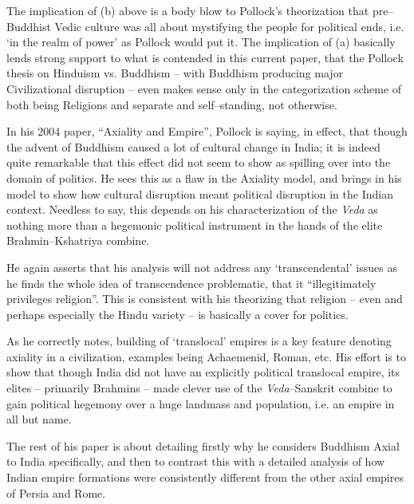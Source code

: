 The implication of (b) above is a body blow to Pollock’s theorization that pre–Buddhist Vedic culture was all about mystifying the people for political ends, i.e. ‘in the realm of power’ as Pollock would put it. The implication of (a) basically lends strong support to what is contended in this current paper, that the Pollock thesis on Hinduism vs. Buddhism – with Buddhism producing major Civilizational disruption – even makes sense only in the categorization scheme of both being Religions and separate and self–standing, not otherwise.

In his 2004 paper, “Axiality and Empire”, Pollock is saying, in effect, that though the advent of Buddhism caused a lot of cultural change in India; it is indeed quite remarkable that this effect did not seem to show as spilling over into the domain of politics. He sees this as a flaw in the Axiality model, and brings in his model to show how cultural disruption meant political disruption in the Indian context. Needless to say, this depends on his characterization of the \textit{Veda} as nothing more than a hegemonic political instrument in the hands of the elite Brahmin–Kshatriya combine.

He again asserts that his analysis will not address any ‘transcendental’ issues as he finds the whole idea of transcendence problematic, that it “illegitimately privileges religion”. This is consistent with his theorizing that religion – even and perhaps especially the Hindu variety – is basically a cover for politics.

As he correctly notes, building of ‘translocal’ empires is a key feature denoting axiality in a civilization, examples being Achaemenid, Roman, etc. His effort is to show that though India did not have an explicitly political translocal empire, its elites – primarily Brahmins – made clever use of the \textit{Veda}–Sanskrit combine to gain political hegemony over a huge landmass and population, i.e. an empire in all but name.

The rest of his paper is about detailing firstly why he considers Buddhism Axial to India specifically, and then to contrast this with a detailed analysis of how Indian empire formations were consistently different from the other axial empires of Persia and Rome.

